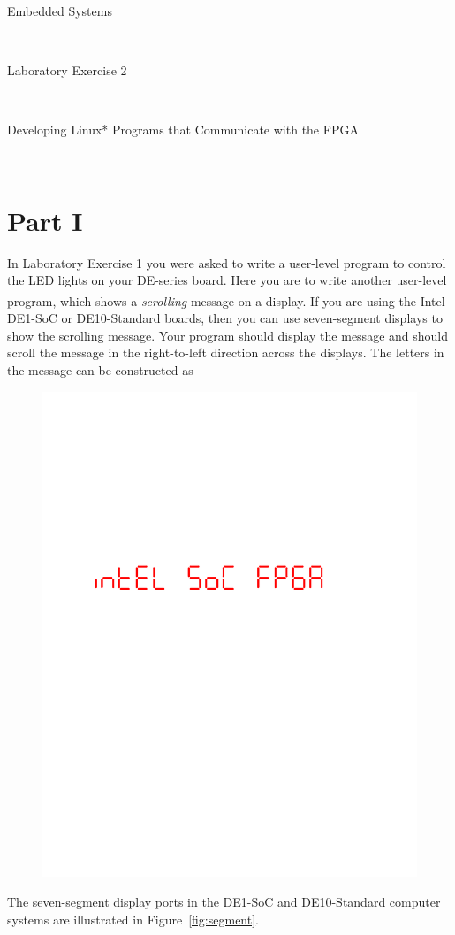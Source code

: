 \documentclass[epsfig,10pt,fullpage]{article}
\newcommand{\LabNum}{2}
\begin{document}
\centerline{\huge Embedded Systems}
~\\
\centerline{\huge Laboratory Exercise \LabNum}
~\\
\centerline{\large Developing Linux* Programs that Communicate with the FPGA}
~\\

\section*{Part I}
\noindent
In Laboratory Exercise 1 you were asked to write a user-level program to control the LED
lights on your DE-series board. Here you are to write another user-level program, which
shows a {\it scrolling} message on a display. If you are using the Intel \textsuperscript{\textregistered} DE1-SoC or
DE10-Standard boards, then you can use seven-segment displays to show the scrolling message. 
Your program should display the message \texttt{} and should scroll the 
message in the right-to-left direction across the displays. The letters in the message can be 
constructed as

\begin{figure}[h!]
   \begin{center}
			  \includegraphics[scale=0.33]{figures/HEX_words.pdf}
   \end{center}
	\label{fig:HEXwords}
\end{figure}
\noindent
The seven-segment display ports in the DE1-SoC and DE10-Standard computer 
systems are illustrated in Figure~\ref{fig:segment}.
\end{document}
